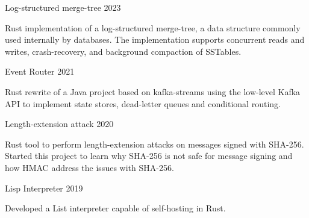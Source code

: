 

\begin{cventries}

  \cventry
    {} %
    {Log-structured merge-tree} %
    {} %
    {2023} %
    {
      \begin{cvitems} %
        \item {Rust implementation of a log-structured merge-tree, a data structure commonly used internally by databases. The implementation supports concurrent reads and writes, crash-recovery, and background compaction of SSTables.}
      \end{cvitems}
    }

  \cventry
    {} %
    {Event Router} %
    {} %
    {2021} %
    {
      \begin{cvitems} %
        \item {Rust rewrite of a Java project based on kafka-streams using the low-level Kafka API to implement state stores, dead-letter queues and conditional routing.}
      \end{cvitems}
    }

  \cventry
    {}
    {Length-extension attack} %
    {}
    {2020}
    {
      \begin{cvitems} %
        \item {Rust tool to perform length-extension attacks on messages signed with SHA-256. Started this project to learn why SHA-256 is not safe for message signing and how HMAC address the issues with SHA-256.}
      \end{cvitems}
    }
    
  \cventry
    {} %
    {Lisp Interpreter} %
    {} %
    {2019} %
    {
      \begin{cvitems} %
        \item {Developed a List interpreter capable of self-hosting in Rust.}
      \end{cvitems}
    }

\end{cventries}
